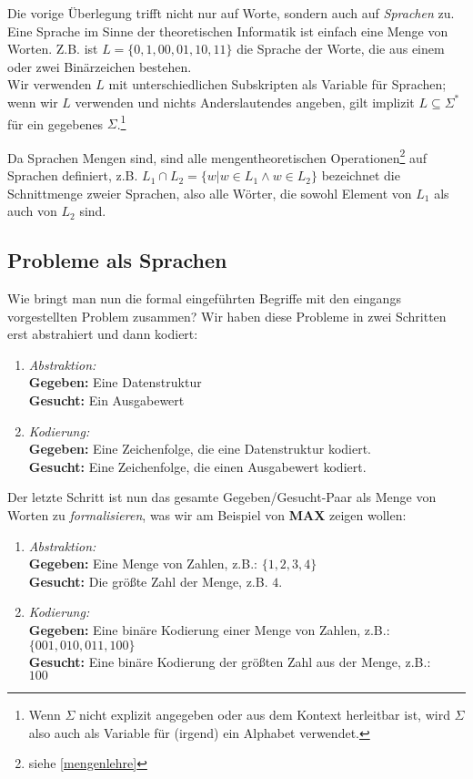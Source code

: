 Die vorige Überlegung trifft nicht nur auf Worte, sondern auch auf \emph{Sprachen} zu.
Eine Sprache im Sinne der theoretischen Informatik ist einfach eine Menge von Worten.
Z.B. ist $L = \{0, 1, 00, 01, 10, 11 \}$ die Sprache der Worte, die aus einem oder zwei Binärzeichen bestehen.\\

\noindent
Wir verwenden $L$ mit unterschiedlichen Subskripten als Variable für Sprachen;
wenn wir $L$ verwenden und nichts Anderslautendes angeben,
gilt implizit $L \subseteq \Sigma^*$ für ein gegebenes $\Sigma$.\footnote{
Wenn $\Sigma$ nicht explizit angegeben oder aus dem Kontext herleitbar ist,
wird $\Sigma$ also auch als Variable für (irgend) ein Alphabet verwendet.}


\noindent
Da Sprachen Mengen sind,
sind alle mengentheoretischen Operationen\footnote{siehe \autoref{mengenlehre}}
auf Sprachen definiert,
z.B. $L_1 \cap L_2 = \{w | w \in L_1 \wedge w \in L_2\}$
bezeichnet die Schnittmenge zweier Sprachen, also alle Wörter,
die sowohl Element von $L_1$ als auch von $L_2$ sind.

\subsection{Probleme als Sprachen}
Wie bringt man nun die formal eingeführten Begriffe mit den eingangs vorgestellten Problem zusammen?
Wir haben diese Probleme in zwei Schritten erst abstrahiert und dann kodiert:
\begin{enumerate}
    \item \emph{Abstraktion:}
        \\\textbf{Gegeben:} Eine Datenstruktur
        \\\textbf{Gesucht:} Ein Ausgabewert
    \item \emph{Kodierung:}
        \\\textbf{Gegeben:} Eine Zeichenfolge, die eine Datenstruktur kodiert.
        \\\textbf{Gesucht:} Eine Zeichenfolge, die einen Ausgabewert kodiert.
\end{enumerate}
Der letzte Schritt ist nun das gesamte Gegeben/Gesucht-Paar
als Menge von Worten zu \emph{formalisieren},
was wir am Beispiel von \textbf{MAX} zeigen wollen:
\begin{enumerate}
    \item \emph{Abstraktion:}
        \\\textbf{Gegeben:} Eine Menge von Zahlen, z.B.: $\{1,2,3,4\}$
        \\\textbf{Gesucht:} Die größte Zahl der Menge, z.B. $4$.
    \item \emph{Kodierung:}
        \\\textbf{Gegeben:} Eine binäre Kodierung einer Menge von Zahlen, z.B.:
        \\$\{001, 010, 011, 100\}$
        \\\textbf{Gesucht:} Eine binäre Kodierung der größten Zahl aus der Menge, z.B.:
        \\$100$
\end{enumerate}

